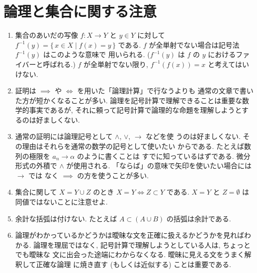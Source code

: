 \documentclass[12pt,twoside]{jarticle}
\newcommand\commentout[1]{#1}
\newcommand\commentout[1]{}
\begin{document}





\section*{論理と集合に関する注意}

\begin{enumerate}
\item 集合のあいだの写像 $f:X\to Y$ と $y\in Y$ に対して %
  $f^{-1}(y)=\{\,x\in X\mid f(x)=y\,\}$ である. 
  $f$ が全単射でない場合は記号法 $f^{-1}(y)$ はこのような意味で
  用いられる. ($f^{-1}(y)$ は $f$ の $y$ におけるファイバーと呼ばれる.)
  $f$ が全単射でない限り, $f^{-1}(f(x))=x$ と考えてはいけない.

\item 証明は $\implies$ や $\iff$ を用いた「論理計算」で行なうよりも
  通常の文章で書いた方が短かくなることが多い.
  論理を記号計算で理解できることは重要な数学的事実であるが,
  それに頼って記号計算で論理的な命題を理解しようとするのは好ましくない.
  
\item 通常の証明には論理記号として $\wedge$, $\vee$, $\rightarrow$ などを使
  うのは好ましくない. その理由はそれらを通常の数学の記号として使いたい
  からである. たとえば数列の極限を $a_n\rightarrow\alpha$ のように書くことは
  すでに知っているはずである. 微分形式の外積で $\wedge$ が使用される.
  「ならば」の意味で矢印を使いたい場合には $\rightarrow$ では
  なく $\implies$ の方を使うことが多い.

\item 集合に関して $X=Y\cup Z$ のとき $X=Y \iff Z\subset Y$ である.
  $X=Y$ と $Z=\emptyset$ は同値ではないことに注意せよ.

\item 余計な括弧は付けない. たとえば $A\subset(A\cup B)$ の括弧は余計である.

\item 論理がわかっているかどうかは曖昧な文を正確に扱えるかどうかを見ればわかる.
  論理を理屈ではなく, 記号計算で理解しようとしている人は, ちょっとでも曖昧な
  文に出会った途端にわからなくなる. 曖昧に見える文をうまく解釈して正確な論理
  に焼き直す (もしくは近似する) ことは重要である.
  

\end{enumerate}
\end{document}
